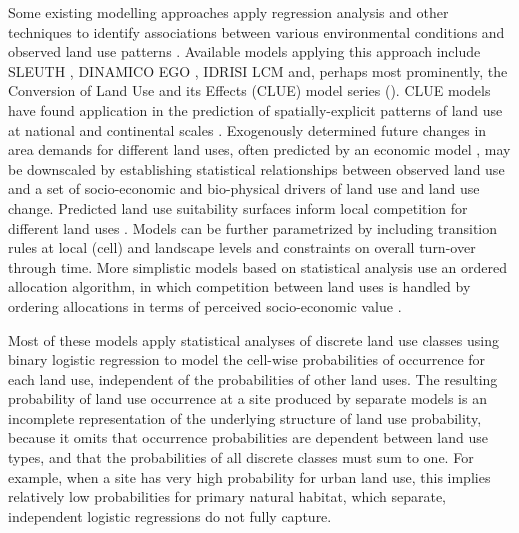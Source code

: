 \documentclass[titlesmallcaps,copyrightpage]{uomthesis}\usepackage[]{graphicx}\usepackage[]{color}
\begin{document}
Some existing modelling approaches apply regression analysis and other
techniques to identify associations between various environmental
conditions and observed land use patterns
\citep{koomen_core_2011, lambin_global_2011, verburg_land_2004}. Available
models applying this approach include SLEUTH
\citep{dietzel_toward_2007}, DINAMICO EGO
\citep{soares-filho_modeling_2009}, IDRISI LCM
\citep{eastman_short_2018} and, perhaps most prominently, the Conversion
of Land Use and its Effects (CLUE) model series (). CLUE models have found application in the
prediction of spatially-explicit patterns of land use at national and
continental scales
\citep{veldkamp_clue_1996, verburg_combining_2009, verburg_land_1999, verburg_modeling_2002, kapitza_assessing_2021}.
Exogenously determined future changes in area demands for different land
uses, often predicted by an economic model \citep{aguiar_overview_2016},
may be downscaled by establishing statistical relationships between
observed land use and a set of socio-economic and bio-physical drivers
of land use and land use change. Predicted land use suitability surfaces
inform local competition for different land uses
\citep{verburg_modeling_2002, meiyappan_spatial_2014}. Models can be
further parametrized by including transition rules at local (cell) and
landscape levels and constraints on overall turn-over through time. More
simplistic models based on statistical analysis use an ordered
allocation algorithm, in which competition between land uses is handled
by ordering allocations in terms of perceived socio-economic value
\citep{fuchs_high-resolution_2013}.

Most of these models apply statistical analyses of discrete land use
classes using binary logistic regression to model the cell-wise
probabilities of occurrence for each land use, independent of the
probabilities of other land uses. The resulting probability of land use
occurrence at a site produced by separate models is an incomplete
representation of the underlying structure of land use probability,
because it omits that occurrence probabilities are dependent between
land use types, and that the probabilities of all discrete classes must
sum to one. For example, when a site has very high probability for urban
land use, this implies relatively low probabilities for primary natural
habitat, which separate, independent logistic regressions do not fully
capture.
\end{document}
